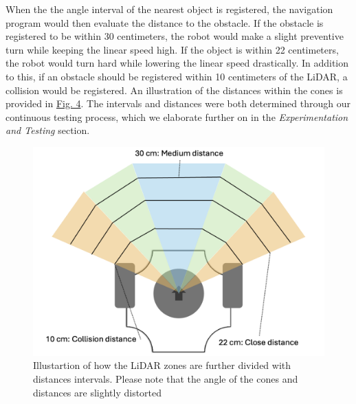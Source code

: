 \documentclass[conference]{IEEEtran}
\begin{document}
When the the angle interval of the nearest object is registered, the navigation program would then evaluate the distance to the obstacle.
If the obstacle is registered to be within 30 centimeters, the robot would make a slight preventive turn while keeping the linear speed high.
If the object is within 22 centimeters, the robot would turn hard while lowering the linear speed drastically.
In addition to this, if an obstacle should be registered within 10 centimeters of the LiDAR, a collision would be registered.
An illustration of the distances within the cones is provided in \href{sec:distances}{Fig. 4}.
The intervals and distances were both determined through our continuous testing process, which we elaborate further on in the \textit{Experimentation and Testing} section.
\begin{figure}[htbp]
    \centerline{\includegraphics[width=1.0\columnwidth]{Pictures/LiDAR Distances.png}}
    \caption{Illustartion of how the LiDAR zones are further divided with distances intervals. 
    Please note that the angle of the cones and distances are slightly distorted}
    \label{sec:distances}
    \end{figure}
\end{document}
